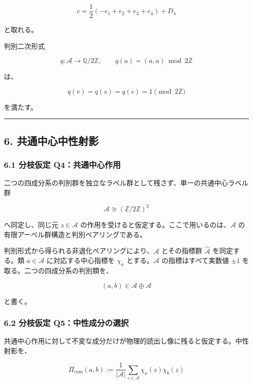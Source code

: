 \documentclass[
  a4paper,
  ja=minimal,
  xelatex,
  paragraph-mark={},
]{bxjsarticle}
\begin{document}
\[
c=
\frac12
(-e_1+e_2+e_3+e_4)
{}+D_4
\]

と取れる。

判別二次形式

\[
q:
\mathcal A
\longrightarrow
\mathbb Q/2\mathbb Z,
\qquad
q(a)
{}=
(a,a)
\bmod
2\mathbb Z
\]

は、

\[
q(v)
{}=
q(s)
{}=
q(c)
{}=1
\pmod{2\mathbb Z}
\]

を満たす。

\begin{center}\rule{0.5\linewidth}{0.5pt}\end{center}

\subsection{6.
共通中心中性射影}\label{ux5171ux901aux4e2dux5fc3ux4e2dux6027ux5c04ux5f71}

\subsubsection{6.1 分枝仮定
Q4：共通中心作用}\label{ux5206ux679dux4eeeux5b9a-q4ux5171ux901aux4e2dux5fc3ux4f5cux7528}

二つの四成分系の判別群を独立なラベル群として残さず、単一の共通中心ラベル群

\[
\mathcal A
\cong
(\mathbb Z/2\mathbb Z)^2
\]

へ同定し、同じ元 \(z\in\mathcal A\)
の作用を受けると仮定する。ここで用いるのは、\(\mathcal A\)
の有限アーベル群構造と判別ペアリングである。

判別形式から得られる非退化ペアリングにより、\(\mathcal A\) とその指標群
\(\widehat{\mathcal A}\) を同定する。類 \(a\in\mathcal A\)
に対応する中心指標を \(\chi_a\) とする。\(\mathcal A\)
の指標はすべて実数値 \(\pm1\) を取る。二つの四成分系の判別類を、

\[
(a,b)
\in
\mathcal A\oplus\mathcal A
\]

と書く。

\subsubsection{6.2 分枝仮定
Q5：中性成分の選択}\label{ux5206ux679dux4eeeux5b9a-q5ux4e2dux6027ux6210ux5206ux306eux9078ux629e}

共通中心作用に対して不変な成分だけが物理的読出し像に残ると仮定する。中性射影を、

\[
\Pi_{\mathrm{com}}(a,b)
:=
\frac{1}{|\mathcal A|}
\sum_{z\in\mathcal A}
\chi_a(z)\chi_b(z)
\]
\end{document}
